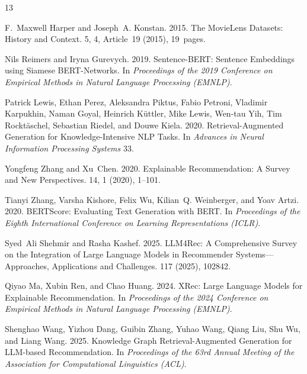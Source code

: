 \documentclass[sigconf,nonacm]{acmart}
\begin{document}
\newpage


\begin{thebibliography}{13}

F.~Maxwell Harper and Joseph~A. Konstan. 2015.
\newblock The MovieLens Datasets: History and Context.
 5, 4, Article~19 (2015), 19~pages.

Nils Reimers and Iryna Gurevych. 2019.
\newblock Sentence-BERT: Sentence Embeddings using Siamese BERT-Networks.
\newblock In {\em Proceedings of the 2019 Conference on Empirical Methods in Natural Language Processing (EMNLP)}.

Patrick Lewis, Ethan Perez, Aleksandra Piktus, Fabio Petroni, Vladimir Karpukhin, Naman Goyal, Heinrich K\"{u}ttler, Mike Lewis, Wen-tau Yih, Tim Rockt\"{a}schel, Sebastian Riedel, and Douwe Kiela. 2020.
\newblock Retrieval-Augmented Generation for Knowledge-Intensive NLP Tasks.
\newblock In {\em Advances in Neural Information Processing Systems\/} 33.

Yongfeng Zhang and Xu~Chen. 2020.
\newblock Explainable Recommendation: A Survey and New Perspectives.
 14, 1 (2020), 1--101.

Tianyi Zhang, Varsha Kishore, Felix Wu, Kilian~Q. Weinberger, and Yoav Artzi. 2020.
\newblock BERTScore: Evaluating Text Generation with BERT.
\newblock In {\em Proceedings of the Eighth International Conference on Learning Representations (ICLR)}.

Syed~Ali Shehmir and Rasha Kashef. 2025.
\newblock LLM4Rec: A Comprehensive Survey on the Integration of Large Language Models in Recommender Systems---Approaches, Applications and Challenges.
 117 (2025), 102842.

Qiyao Ma, Xubin Ren, and Chao Huang. 2024.
\newblock XRec: Large Language Models for Explainable Recommendation.
\newblock In {\em Proceedings of the 2024 Conference on Empirical Methods in Natural Language Processing (EMNLP)}.

Shenghao Wang, Yizhou Dang, Guibin Zhang, Yuhao Wang, Qiang Liu, Shu Wu, and Liang Wang. 2025.
\newblock Knowledge Graph Retrieval-Augmented Generation for LLM-based Recommendation.
\newblock In {\em Proceedings of the 63rd Annual Meeting of the Association for Computational Linguistics (ACL)}.


\end{thebibliography}
\end{document}
